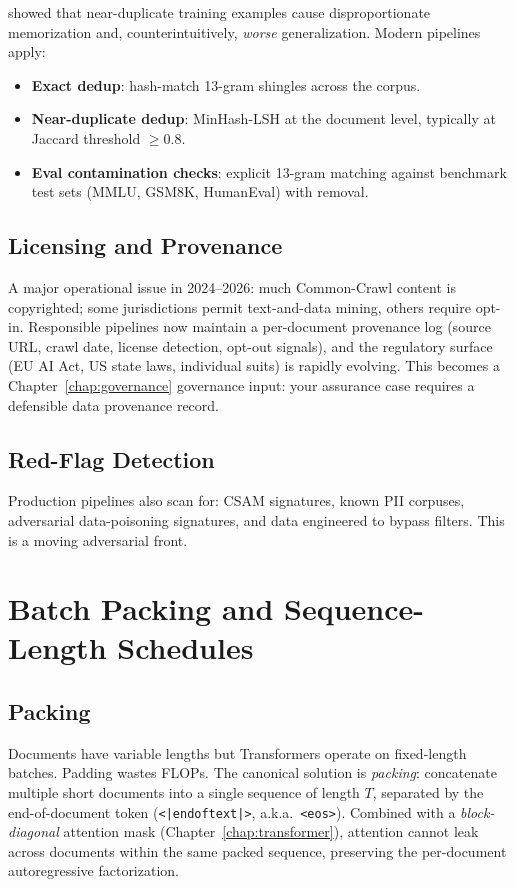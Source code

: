\citet{lee2022deduplicating} showed that near-duplicate training
examples cause disproportionate memorization and, counterintuitively,
\emph{worse} generalization. Modern pipelines apply:
\begin{itemize}
  \item \textbf{Exact dedup}: hash-match 13-gram shingles across the
        corpus.
  \item \textbf{Near-duplicate dedup}: MinHash-LSH at the document
        level, typically at Jaccard threshold $\ge 0.8$.
  \item \textbf{Eval contamination checks}: explicit 13-gram matching
        against benchmark test sets (MMLU, GSM8K, HumanEval) with
        removal.
\end{itemize}

\subsection{Licensing and Provenance}

A major operational issue in 2024--2026: much Common-Crawl content is
copyrighted; some jurisdictions permit text-and-data mining, others
require opt-in. Responsible pipelines now maintain a per-document
provenance log (source URL, crawl date, license detection, opt-out
signals), and the regulatory surface (EU AI Act, US state laws,
individual suits) is rapidly evolving. This becomes a Chapter~\ref{chap:governance}
governance input: your assurance case requires a defensible data
provenance record.

\subsection{Red-Flag Detection}

Production pipelines also scan for: CSAM signatures, known PII
corpuses, adversarial data-poisoning signatures, and data engineered
to bypass filters. This is a moving adversarial front.

\section{Batch Packing and Sequence-Length Schedules}

\subsection{Packing}

Documents have variable lengths but Transformers operate on
fixed-length batches. Padding wastes FLOPs. The canonical solution is
\emph{packing}: concatenate multiple short documents into a single
sequence of length $T$, separated by the end-of-document token
(\texttt{<|endoftext|>}, a.k.a.\ \texttt{<eos>}). Combined with a
\emph{block-diagonal} attention mask (Chapter~\ref{chap:transformer}), attention cannot leak
across documents within the same packed sequence, preserving the
per-document autoregressive factorization.

